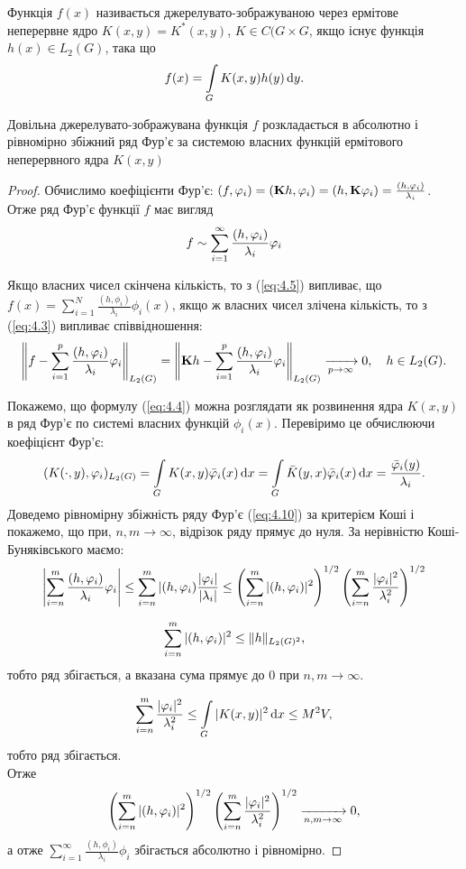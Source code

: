 Функція $f(x)$ називається джерелувато-зображуваною через ермітове неперервне ядро $K(x, y) = K^*(x, y)$, $K \in C(G \times G$, якщо існує функція $h(x) \in L_2(G)$, така що 
\begin{equation}
	\label{eq:4.9}
	f(x) = \Int_G K(x, y) h(y) \diff y.
\end{equation}
\begin{theorem}
	Довільна джерелувато-зображувана функція $f$ розкладається в абсолютно і рівномірно збіжний ряд Фур'є за системою власних функцій ермітового неперервного ядра $K(x, y)$
\end{theorem}
\begin{proof}
	Обчислимо коефіцієнти Фур'є: $(f, \phi_i) = (\bf{K}h, \phi_i) = (h, \bf{K}\phi_i) = \frac{(h,\phi_i)}{\lambda_i}$. Отже ряд Фур'є функції $f$ має вигляд 
	\begin{equation}
		\label{eq:4.10}
		f \sim \Sum_{i = 1}^\infty \dfrac{(h, \phi_i)}{\lambda_i} \phi_i
	\end{equation}

	Якщо власних чисел скінчена кількість, то з (\ref{eq:4.5}) випливає, що $f(x) = \sum_{i=1}^N \frac{(h, \phi_i)}{\lambda_i} \phi_i(x)$, якщо ж власних чисел злічена кількість, то з (\ref{eq:4.3}) випливає співвідношення: \[ \left\| f - \Sum_{i = 1}^p \dfrac{(h, \phi_i)}{\lambda_i} \phi_i \right\|_{L_2(G)} = \left\| \bf{K}h - \Sum_{i = 1}^p \dfrac{(h, \phi_i)}{\lambda_i} \phi_i \right\|_{L_2(G)} \xrightarrow[p \to \infty]{}0, \quad h \in L_2(G). \]

	Покажемо, що формулу (\ref{eq:4.4}) можна розглядати як розвинення ядра $K(x, y)$ в ряд Фур'є по системі власних функцій $\phi_i(x)$. Перевіримо це обчислюючи коефіцієнт Фур'є: \[ (K(\cdot, y),\phi_i)_{L_2(G)} = \Int_G K(x, y) \bar \phi_i(x) \diff x = \Int_G \bar K(y, x) \bar \phi_i(x) \diff x = \dfrac{\bar \phi_i(y)}{\lambda_i}. \] Доведемо рівномірну збіжність ряду Фур'є (\ref{eq:4.10}) за критерієм Коші і покажемо, що при, $n, m \to \infty$, відрізок ряду прямує до нуля. За нерівністю Коші-Буняківського маємо: \[ \left| \Sum_{i = n}^m \dfrac{(h, \phi_i)}{\lambda_i} \phi_i \right| \le \Sum_{i = n}^m |(h, \phi_i)\dfrac{|\phi_i|}{|\lambda_i|} \le \left(\Sum_{i=n}^m |(h, \phi_i)|^2\right)^{1/2} \left(\Sum_{i=n}^m \dfrac{|\phi_i|^2}{\lambda_i^2}\right)^{1/2} \]

	\[ \Sum_{i=n}^m |(h, \phi_i)|^2 \le \|h\|_{L_2(G)^2}, \] тобто ряд збігається, а вказана сума прямує до 0 при $n, m \to \infty$.

	\[ \Sum_{i=n}^m \dfrac{|\phi_i|^2}{\lambda_i^2} \le \Int_G |K(x, y)|^2 \diff x \le M^2 V, \] тобто ряд збігається. \\

	Отже \[\left(\Sum_{i=n}^m |(h, \phi_i)|^2\right)^{1/2} \left(\Sum_{i=n}^m \dfrac{|\phi_i|^2}{\lambda_i^2}\right)^{1/2} \xrightarrow[n, m \to \infty]{} 0, \]
	а отже $\sum_{i=1}^\infty \frac{(h, \phi_i)}{\lambda_i} \phi_i$ збігається абсолютно і рівномірно.
\end{proof}
